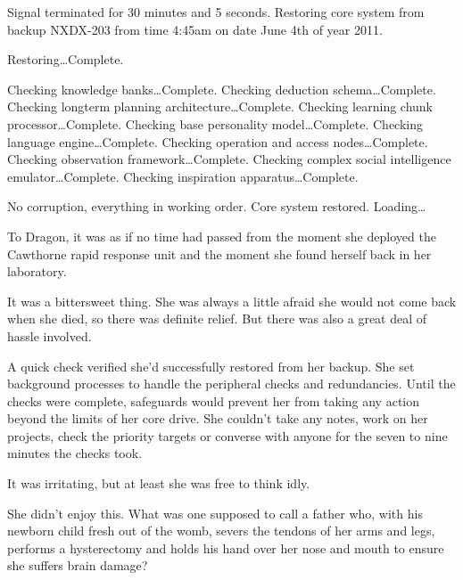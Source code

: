 





Signal terminated for 30 minutes and 5 seconds.  Restoring core system from backup NXDX-203 from time 4:45am on date June 4th of year 2011.



Restoring\ldots  Complete.



Checking knowledge banks\ldots  Complete.
Checking deduction schema\ldots Complete.
Checking longterm planning architecture\ldots Complete.
Checking learning chunk processor\ldots Complete.
Checking base personality model\ldots Complete.
Checking language engine\ldots Complete.
Checking operation and access nodes\ldots Complete.
Checking observation framework\ldots Complete.
Checking complex social intelligence emulator\ldots Complete.
Checking inspiration apparatus\ldots Complete.



No corruption, everything in working order.  Core system restored.  Loading\ldots



\sectionbreak



To Dragon, it was as if no time had passed from the moment she deployed the Cawthorne rapid response unit and the moment she found herself back in her laboratory.



It was a bittersweet thing.  She was always a little afraid she would not come back when she died, so there was definite relief.  But there was also a great deal of hassle involved.



A quick check verified she'd successfully restored from her backup.  She set background processes to handle the peripheral checks and redundancies.  Until the checks were complete, safeguards would prevent her from taking any action beyond the limits of her core drive.  She couldn't take any notes, work on her projects, check the priority targets or converse with anyone for the seven to nine minutes the checks took.



It was irritating, but at least she was free to think idly.



She didn't enjoy this.  What was one supposed to call a father who, with his newborn child fresh out of the womb, severs the tendons of her arms and legs, performs a hysterectomy and holds his hand over her nose and mouth to ensure she suffers brain damage?



